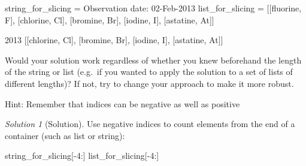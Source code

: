 \documentclass[
  letterpaper,
  DIV=11,
  numbers=noendperiod]{scrartcl}
\newenvironment{Shaded}{\begin{snugshade}}{\end{snugshade}}
\newcommand{\DecValTok}[1]{\textcolor[rgb]{0.68,0.00,0.00}{#1}}
\newcommand{\NormalTok}[1]{\textcolor[rgb]{0.00,0.23,0.31}{#1}}
\newcommand{\OperatorTok}[1]{\textcolor[rgb]{0.37,0.37,0.37}{#1}}
\newcommand{\StringTok}[1]{\textcolor[rgb]{0.13,0.47,0.30}{#1}}
\theoremstyle{remark}
\newtheorem*{solution}{Solution}
\begin{document}
\begin{Shaded}
\begin{Highlighting}[]
\NormalTok{string\_for\_slicing }\OperatorTok{=} \StringTok{\textquotesingle{}Observation date: 02{-}Feb{-}2013\textquotesingle{}}
\NormalTok{list\_for\_slicing }\OperatorTok{=}\NormalTok{ [[}\StringTok{\textquotesingle{}fluorine\textquotesingle{}}\NormalTok{, }\StringTok{\textquotesingle{}F\textquotesingle{}}\NormalTok{],}
\NormalTok{                    [}\StringTok{\textquotesingle{}chlorine\textquotesingle{}}\NormalTok{, }\StringTok{\textquotesingle{}Cl\textquotesingle{}}\NormalTok{],}
\NormalTok{                    [}\StringTok{\textquotesingle{}bromine\textquotesingle{}}\NormalTok{, }\StringTok{\textquotesingle{}Br\textquotesingle{}}\NormalTok{],}
\NormalTok{                    [}\StringTok{\textquotesingle{}iodine\textquotesingle{}}\NormalTok{, }\StringTok{\textquotesingle{}I\textquotesingle{}}\NormalTok{],}
\NormalTok{                    [}\StringTok{\textquotesingle{}astatine\textquotesingle{}}\NormalTok{, }\StringTok{\textquotesingle{}At\textquotesingle{}}\NormalTok{]]}
\end{Highlighting}
\end{Shaded}

\begin{Shaded}
\begin{Highlighting}[]
\NormalTok{\textquotesingle{}2013\textquotesingle{}}
\NormalTok{[[\textquotesingle{}chlorine\textquotesingle{}, \textquotesingle{}Cl\textquotesingle{}], [\textquotesingle{}bromine\textquotesingle{}, \textquotesingle{}Br\textquotesingle{}], [\textquotesingle{}iodine\textquotesingle{}, \textquotesingle{}I\textquotesingle{}], [\textquotesingle{}astatine\textquotesingle{}, \textquotesingle{}At\textquotesingle{}]]}
\end{Highlighting}
\end{Shaded}

Would your solution work regardless of whether you knew beforehand the
length of the string or list (e.g.~if you wanted to apply the solution
to a set of lists of different lengths)? If not, try to change your
approach to make it more robust.

Hint: Remember that indices can be negative as well as positive

\begin{solution}[Solution]
Use negative indices to count elements from the end of a container (such
as list or string):

\begin{Shaded}
\begin{Highlighting}[]
\NormalTok{string\_for\_slicing[}\OperatorTok{{-}}\DecValTok{4}\NormalTok{:]}
\NormalTok{list\_for\_slicing[}\OperatorTok{{-}}\DecValTok{4}\NormalTok{:]}
\end{Highlighting}
\end{Shaded}

\end{solution}
\end{document}
